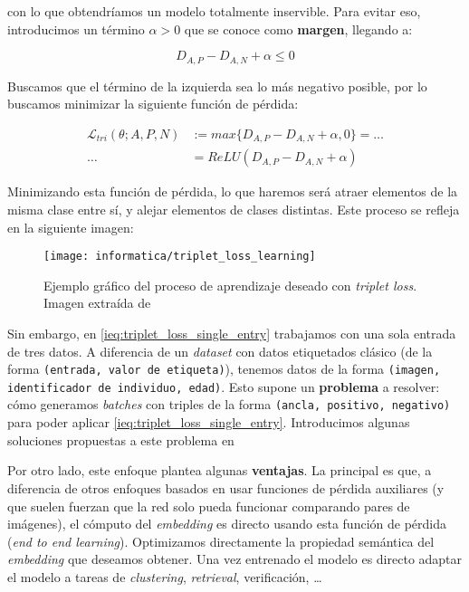 con lo que obtendríamos un modelo totalmente inservible. Para evitar eso, introducimos un término $\alpha > 0$ que se conoce como \textbf{margen}, llegando a:

\begin{equation}
    D_{A, P} - D_{A, N} + \alpha \leq 0
\end{equation}

Buscamos que el término de la izquierda sea lo más negativo posible, por lo buscamos minimizar la siguiente función de pérdida:

\begin{equation} \label{ieq:triplet_loss_single_entry}
\begin{split}
    \mathcal{L}_{tri}(\theta; A, P, N) & := max \{D_{A, P} - D_{A, N} + \alpha, 0 \} = \ldots \\
    \ldots &= ReLU(D_{A, P} - D_{A, N} + \alpha)
\end{split}
\end{equation}

Minimizando esta función de pérdida, lo que haremos será atraer elementos de la misma clase entre sí, y alejar elementos de clases distintas. Este proceso se refleja en la siguiente imagen:

\begin{figure}[H]
    \centering
    \texttt{[image: informatica/triplet\_loss\_learning]}
    \caption{Ejemplo gráfico del proceso de aprendizaje deseado con \textit{triplet loss}. Imagen extraída de \cite{informatica:facenet}}
\end{figure}

Sin embargo, en \eqref{ieq:triplet_loss_single_entry} trabajamos con una sola entrada de tres datos. A diferencia de un \textit{dataset} con datos etiquetados clásico (de la forma \lstinline{(entrada, valor de etiqueta)}), tenemos datos de la forma \lstinline{(imagen, identificador de individuo, edad)}. Esto supone un \textbf{problema} a resolver: cómo generamos \textit{batches} con triples de la forma \lstinline{(ancla, positivo, negativo)} para poder aplicar \eqref{ieq:triplet_loss_single_entry}. Introducimos algunas soluciones propuestas a este problema en 

Por otro lado, este enfoque plantea algunas \textbf{ventajas}. La principal es que, a diferencia de otros enfoques basados en usar funciones de pérdida auxiliares (y que suelen fuerzan que la red solo pueda funcionar comparando pares de imágenes), el cómputo del \textit{embedding} es directo usando esta función de pérdida (\textit{end to end learning}). Optimizamos directamente la propiedad semántica del \textit{embedding} que deseamos obtener. Una vez entrenado el modelo es directo adaptar el modelo a tareas de \textit{clustering}, \textit{retrieval}, verificación, \ldots \cite{informatica:principal}

